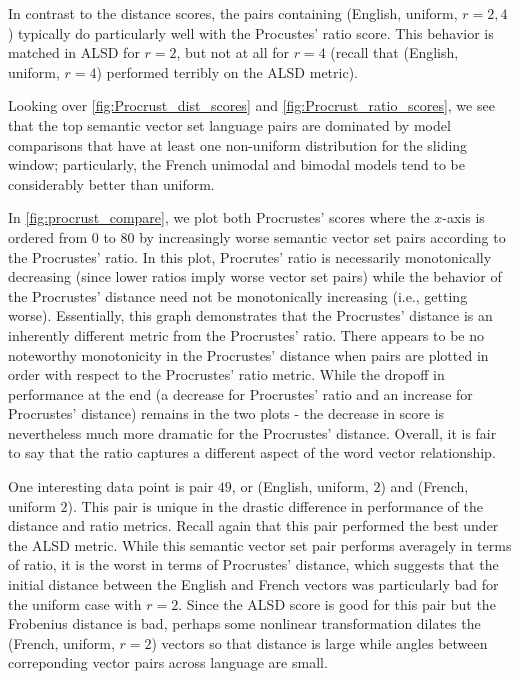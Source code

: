 \documentclass[12pt, usenames]{article}
\theoremstyle{definition}
\theoremstyle{definition}
\theoremstyle{definition}
\begin{document}
In contrast to the distance scores, the pairs containing (English, uniform, $r = 2, 4$) typically do particularly well with the Procustes' ratio score. This behavior is matched in ALSD for $r = 2$, but not at all for $r = 4$ (recall that (English, uniform, $r = 4$) performed terribly on the ALSD metric). 

Looking over \autoref{fig:Procrust_dist_scores} and \autoref{fig:Procrust_ratio_scores}, we see that the top semantic vector set language pairs are dominated by model comparisons that have at least one non-uniform distribution for the sliding window; particularly, the French unimodal and bimodal models tend to be considerably better than uniform. 
 
In \autoref{fig:procrust_compare}, we plot both Procrustes' scores where the $x$-axis is ordered from $0$ to $80$ by increasingly worse semantic vector set pairs according to the Procrustes' ratio. In this plot, Procrutes' ratio is necessarily monotonically decreasing (since lower ratios imply worse vector set pairs) while the behavior of the Procrustes' distance need not be monotonically increasing (i.e., getting worse). Essentially, this graph demonstrates that the Procrustes' distance is an inherently different metric from the Procrustes' ratio. There appears to be no noteworthy monotonicity in the Procrustes' distance when pairs are plotted in order with respect to the  Procrustes' ratio metric. While the dropoff in performance at the end (a decrease for Procrustes' ratio and an increase for Procrustes' distance) remains in the two plots - the decrease in score is nevertheless much more dramatic for the Procrustes' distance. Overall, it is fair to say that the ratio captures a different aspect of the word vector relationship. 


One interesting data point is pair $49$, or (English, uniform, $2$) and (French, uniform $2$). This pair is unique in the drastic difference in performance of the distance and ratio metrics. Recall again that this pair performed the best under the ALSD metric. While this semantic vector set pair performs averagely in terms of ratio, it is the worst in terms of Procrustes' distance, which suggests that the initial distance between the English and French vectors was particularly bad for the uniform case with $r = 2$. Since the ALSD score is good for this pair but the Frobenius distance is bad, perhaps some nonlinear transformation dilates the (French, uniform, $r = 2$) vectors so that distance is large while angles between correponding vector pairs across language are small. 
\end{document}

